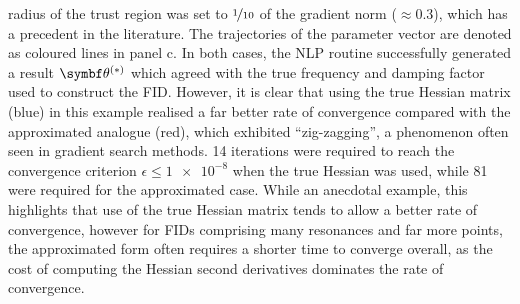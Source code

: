 radius of the trust region was set to $\nicefrac{1}{10}$ of the gradient norm
($\approx 0.3$), which has a precedent in the literature\cite{Gould2005}. The
trajectories of the parameter vector are denoted as coloured lines in panel c.
In both cases, the \ac{NLP} routine successfully generated a result $\bthstar$
which agreed with the true frequency and damping factor used to construct the
\ac{FID}. However, it is clear that using the true Hessian matrix (blue) in
this example realised a far better rate of convergence compared with the
approximated analogue (red), which exhibited ``zig-zagging'', a phenomenon
often seen in gradient search methods. 14 iterations were required to reach the
convergence criterion $\epsilon \leq \num[print-unity-mantissa=false]{1e-8}$
when the true Hessian was used, while 81 were required for the approximated
case. While an anecdotal example, this highlights that use of the true
Hessian matrix tends to allow a better rate of convergence, however for
\acp{FID} comprising many resonances and far more points, the approximated form
often requires a shorter time to converge overall, as the cost of computing the
Hessian second derivatives dominates the rate of convergence.
